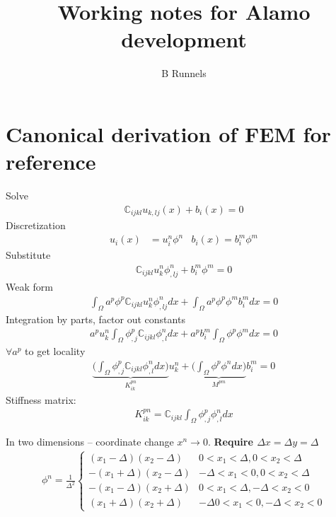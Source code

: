 \documentclass{article}
\title{Working notes for Alamo development}
\author{B Runnels}
\begin{document}
\maketitle



\section{Canonical derivation of FEM for reference}

Solve
\def\C{\mathbb{C}}
\begin{gather}
  \C_{ijkl}u_{k,lj}(x) + b_i(x) = 0
\end{gather}
Discretization
\begin{align}
  u_i(x) &= u^n_i\phi^n 
  & b_i(x) = b^m_i\phi^m
\end{align}
Substitute
\begin{gather}
  \C_{ijkl}u^n_k\phi^n_{,lj}+ b_i^m\phi^m = 0
\end{gather}
Weak form
\begin{gather}
  \int_\Omega a^p\phi^p\C_{ijkl}u^n_k\phi^n_{,lj}dx + \int_\Omega a^p\phi^p \phi^m b_i^m dx = 0
\end{gather}
Integration by parts, factor out constants
\begin{gather}
  a^pu^n_k\int_\Omega \phi_{,j}^p\C_{ijkl}\phi^n_{,l}dx + a^pb_i^m\int_\Omega \phi^p \phi^m  dx = 0
\end{gather}
$\forall a^p$ to get locality
\begin{gather}
  \underbrace{\Big(\int_\Omega \phi_{,j}^p\C_{ijkl}\phi^n_{,l}dx\Big)}_{K^{pn}_{ik}}u^n_k + \underbrace{\Big(\int_\Omega \phi^p \phi^n  dx\Big)}_{M^{pm}}b_i^m = 0
\end{gather}
Stiffness matrix:
\begin{align}
  K^{pn}_{ik} = \C_{ijkl} \int_\Omega \phi_{,j}^p\phi^n_{,l}dx
\end{align}

In two dimensions -- coordinate change $x^n\to 0$. {\bf Require $\Delta x=\Delta y = \Delta$}
\begin{align}
  \phi^n 
  = \frac{1}{\Delta^2}
  \begin{cases}
    (x_1-\Delta)(x_2-\Delta) & 0<x_1<\Delta, 0<x_2<\Delta\\
    -(x_1+\Delta)(x_2-\Delta) & -\Delta <x_1<0, 0<x_2<\Delta\\
    -(x_1-\Delta)(x_2+\Delta) & 0<x_1<\Delta, -\Delta <x_2<0\\
    (x_1+\Delta)(x_2+\Delta) & -\Delta 0<x_1<0, -\Delta<x_2<0
  \end{cases}
\end{align}
\end{document}
